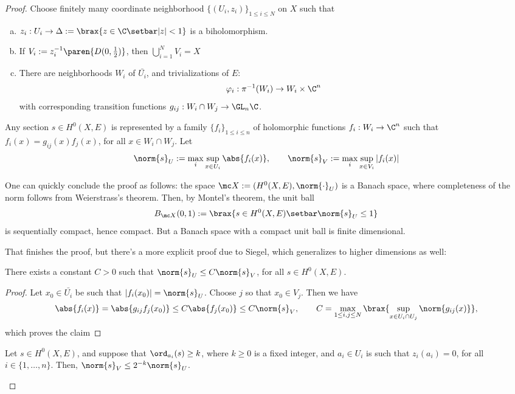 \documentclass[11pt]{report}
\begin{document}
\begin{proof}
    Choose finitely many coordinate neighborhood $\{(U_i,z_i)\}_{1 \leq i \le N}$ on $X$ such that
    \begin{enumerate}[(a)]
        \item $z_i:U _i \to \Delta := \brax{z \in \C \setbar |z| < 1}$ is a biholomorphism.
        \item If $V_i := z_i^{-1}\paren{D(0,\frac{1}{2})}$, then $\bigcup_{i=1}^NV_i =X$
        \item There are neighborhoods $W_i$ of $\bar{U_i}$, and trivializations of $E$: \[
        \varphi_i:\pi^{-1}(W_i) \to W_i \times \C^n
        \]
        with corresponding transition functions $g_{ij}:W_i \cap W_j \to \GL_n\C$.
    \end{enumerate}
    Any section $s \in H^0(X,E)$ is represented by a family $\{f_i\}_{1 \leq i \leq n}$ of holomorphic functions $f_i:W_i \to \C^n$ such that $f_i(x) = g_{ij}(x)f_j(x)$, for all $x \in W_i \cap W_j$. Let
    \[
    \norm{s}_U:= \max_i\sup_{x \in U_i}\abs{f_i(x)}, \qquad \norm{s}_V := \max_i \sup_{x \in V_i}|f_i(x)|
    \]
    \begin{rmk}
        One can quickly conclude the proof as follows: the space $\mc X:=(H^0(X,E),\norm{\cdot}_U)$ is a Banach space, where completeness of the norm follows from Weierstrass's theorem. Then, by Montel's theorem, the unit ball
        \[
        B_{\mc X}(0,1) := \brax{ s \in H^0(X,E)\setbar \norm{s}_U\leq 1  }
        \]
        is sequentially compact, hence compact. But a Banach space with a compact unit ball is finite dimensional.
    \end{rmk}
    That finishes the proof, but there's a more explicit proof due to Siegel, which generalizes to higher dimensions as well:
    \begin{claim}
        There exists a constant $C>0$ such that $\norm{s}_U \leq C\norm{s}_V$, for all $s \in H^0(X,E)$.
    \end{claim}
    \begin{proof}
        Let $x_0 \in \bar{U_i}$ be such that $|f_i(x_0)|=\norm{s}_U$. Choose $j$ so that $x_0 \in V_j$. Then we have
        \[
        \abs{f_i(x)}=\abs{g_{ij}f_j(x_0)} \leq C\abs{f_j(x_0)} \leq C\norm{s}_V, \qquad C= \max_{1 \leq i,j \leq N}\brax{ \sup_{x \in U_i \cap U_j} \norm{g_{ij}(x)} },
        \]
        which proves the claim
    \end{proof}
    \begin{claim}
        Let $s \in H^0(X,E)$, and suppose that $\ord_{a_i}(s) \geq k$, where $k \geq 0$ is a fixed integer, and $a_i \in U_i$ is such that $z_i(a_i)=0$, for all $i \in \{1,\dots,n\}$. Then, $\norm{s}_V \leq 2^{-k}\norm{s}_U$.

\end{claim}
\end{proof}
\end{document}
